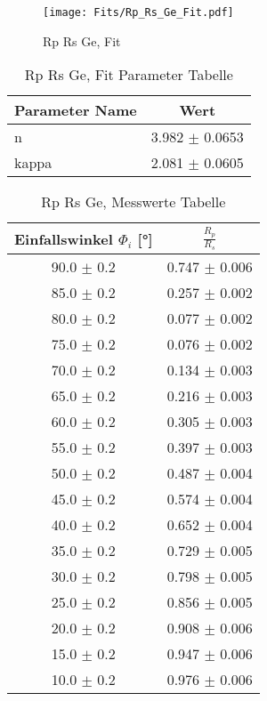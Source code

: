 \begin{figure}[ht] 
 	\centering 
 	\texttt{[image: Fits/Rp\_Rs\_Ge\_Fit.pdf]} 
	\caption{Rp Rs Ge, Fit} 
 	\label{fig:Rp Rs Ge, Fit} 
\end{figure}
 
\begin{table}[ht] 
	\centering 
	\caption{Rp Rs Ge, Fit Parameter Tabelle} 
	\label{tab: Rp Rs Ge, Fit Parameter Tabelle}
	\begin{tabular}{|l|c|}
		\hline
		Parameter Name	&	Wert \\ \hline
		n	&	 3.982 $\pm$  0.0653\\ \hline
		kappa	&	 2.081 $\pm$  0.0605\\ \hline
	\end{tabular} 
\end{table}
 
\begin{table}[ht] 
	\centering 
	\caption{Rp Rs Ge, Messwerte Tabelle} 
	\label{tab: Rp Rs Ge, Messwerte Tabelle}
	\begin{tabular}{|c|c|}
		\hline
		Einfallswinkel $\Phi_i$ [°] 	&	 $\frac{R_p}{R_s}$\\ \hline
		90.0 $\pm$ 0.2 	&	 0.747 $\pm$ 0.006 \\ \hline
		85.0 $\pm$ 0.2 	&	 0.257 $\pm$ 0.002 \\ \hline
		80.0 $\pm$ 0.2 	&	 0.077 $\pm$ 0.002 \\ \hline
		75.0 $\pm$ 0.2 	&	 0.076 $\pm$ 0.002 \\ \hline
		70.0 $\pm$ 0.2 	&	 0.134 $\pm$ 0.003 \\ \hline
		65.0 $\pm$ 0.2 	&	 0.216 $\pm$ 0.003 \\ \hline
		60.0 $\pm$ 0.2 	&	 0.305 $\pm$ 0.003 \\ \hline
		55.0 $\pm$ 0.2 	&	 0.397 $\pm$ 0.003 \\ \hline
		50.0 $\pm$ 0.2 	&	 0.487 $\pm$ 0.004 \\ \hline
		45.0 $\pm$ 0.2 	&	 0.574 $\pm$ 0.004 \\ \hline
		40.0 $\pm$ 0.2 	&	 0.652 $\pm$ 0.004 \\ \hline
		35.0 $\pm$ 0.2 	&	 0.729 $\pm$ 0.005 \\ \hline
		30.0 $\pm$ 0.2 	&	 0.798 $\pm$ 0.005 \\ \hline
		25.0 $\pm$ 0.2 	&	 0.856 $\pm$ 0.005 \\ \hline
		20.0 $\pm$ 0.2 	&	 0.908 $\pm$ 0.006 \\ \hline
		15.0 $\pm$ 0.2 	&	 0.947 $\pm$ 0.006 \\ \hline
		10.0 $\pm$ 0.2 	&	 0.976 $\pm$ 0.006 \\ \hline
	\end{tabular} 
\end{table}
 
